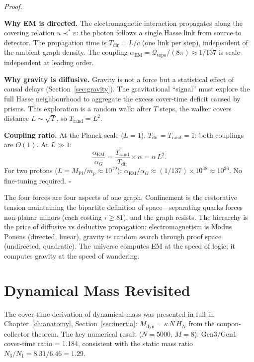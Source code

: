 \documentclass[11pt, a4paper, openany]{book}
\newcommand{\MPl}{M_{\mathrm{Pl}}}
\newcommand{\covers}{\prec^*}              %
\renewenvironment{proof}[1][Proof]{%
  \par\noindent\textit{#1.}\quad
}{\hfill$\square$\par\medskip}
\begin{document}
\begin{proof}
\textbf{Why EM is directed.} The electromagnetic interaction propagates
along the covering relation $u \covers v$: the photon follows a single
Hasse link from source to detector. The propagation time is
$T_{\mathrm{dir}} = L/c$ (one link per step), independent of the
ambient graph density. The coupling
$\alpha_{\mathrm{EM}} = \mathcal{Q}_{\mathrm{topo}}/(8\pi) \approx
1/137$ is scale-independent at leading order.

\textbf{Why gravity is diffusive.} Gravity is not a force but a
statistical effect of causal delays (Section~\ref{sec:gravity}). The
gravitational ``signal'' must explore the full Hasse neighbourhood to
aggregate the excess cover-time deficit caused by prisms. This
exploration is a random walk: after $T$ steps, the walker covers
distance $L \sim \sqrt{T}$, so $T_{\mathrm{rand}} = L^2$.

\textbf{Coupling ratio.} At the Planck scale ($L = 1$),
$T_{\mathrm{dir}} = T_{\mathrm{rand}} = 1$: both couplings are
$O(1)$. At $L \gg 1$:
\[
  \frac{\alpha_{\mathrm{EM}}}{\alpha_G}
  = \frac{T_{\mathrm{rand}}}{T_{\mathrm{dir}}} \times \alpha
  = \alpha\,L^2.
\]
For two protons ($L = \MPl/m_p \approx 10^{19}$):
$\alpha_{\mathrm{EM}}/\alpha_G \approx (1/137) \times 10^{38}
\approx 10^{36}$. No fine-tuning required.
\end{proof}

\begin{logicalreading}
The four forces are four aspects of one graph. Confinement is the restorative tension maintaining the bipartite definition of space---separating quarks forces non-planar minors (each costing $\tau \geq 81$), and the graph resists. The hierarchy is the price of diffusive vs deductive propagation: electromagnetism is Modus Ponens (directed, linear), gravity is random search through proof space (undirected, quadratic). The universe computes EM at the speed of logic; it computes gravity at the speed of wandering.
\end{logicalreading}

\section{Dynamical Mass Revisited}
\label{sec:cover-time}

The cover-time derivation of dynamical mass was presented in full in
Chapter~\ref{ch:anatomy}, Section~\ref{sec:inertia}:
$M_{\mathrm{dyn}} = \kappa\,N\,H_N$ from the coupon-collector theorem.
The key numerical result ($N = 5000$, $M = 8$): Gen3/Gen1 cover-time
ratio = 1.184, consistent with the static mass ratio
$N_3/N_1 = 8.31/6.46 = 1.29$.
\end{document}
